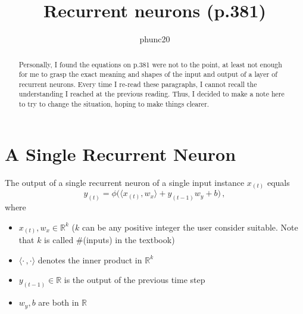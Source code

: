 \documentclass{article}
\author{phunc20}
\title{Recurrent neurons (p.381)}
\begin{document}
\maketitle

\begin{abstract}
Personally, I found the equations on p.381 were not to the point, at least not enough for me to grasp the exact
meaning and shapes of the input and output of a layer of recurrent neurons. Every time I re-read these paragraphs,
I cannot recall the understanding I reached at the previous reading. Thus, I decided to make a note here to try
to change the situation, hoping to make things clearer.
\end{abstract}

\section{A Single Recurrent Neuron}
The output of a single recurrent neuron of a single input instance $x_{(t)}$ equals
$$
  y_{(t)} = \phi\bigg(
    \langle x_{(t)}, w_x \rangle
    + y_{(t-1)} w_y
    + b
  \bigg)\,,
$$
where
\begin{itemize}
  \item $x_{(t)}, w_x \in \mathbb{R}^{k}$ ($k$ can be any positive integer the user consider suitable. Note that $k$ is called \#(inputs) in the textbook)
  \item $\langle \cdot\,, \cdot \rangle$ denotes the inner product in $\mathbb{R}^k$
  \item $y_{(t-1)} \in \mathbb{R}$ is the output of the previous time step
  \item $w_y, b$ are both in $\mathbb{R}$
\end{itemize}




\newpage


%



\end{document}

